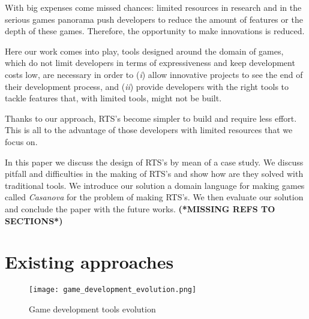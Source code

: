 With big expenses come missed chances: limited resources in research and in the serious games panorama push developers to reduce the amount of features or the depth of these games. Therefore, the opportunity to make innovations is reduced. 

Here our work comes into play, tools designed around the domain of games, which do not limit developers in terms of expressiveness and keep development costs low, are necessary in order to (\textit{i}) allow innovative projects to see the end of their development process, and (\textit{ii}) provide developers with the right tools to tackle features that, with limited tools, might not be built.

\vspace{0.25cm}
\noindent{}

\vspace{0.25cm}
\noindent
Thanks to our approach, RTS's become simpler to build and require less effort. This is all to the advantage of those developers with limited resources that we focus on.


In this paper we discuss the design of RTS's by mean of a case study. We discuss pitfall and difficulties in the making of RTS's and show how are they solved with traditional tools. We introduce our solution a domain language for making games called \textit{Casanova} for the problem of making RTS's. We then evaluate our solution and conclude the paper with the future works. \textbf{(*MISSING REFS TO SECTIONS*)}

\section{Existing approaches}
\begin{figure}[!h]
\centering
\texttt{[image: game\_development\_evolution.png]}
\caption{Game development tools evolution}\label{game_dvelopment}
\end{figure}